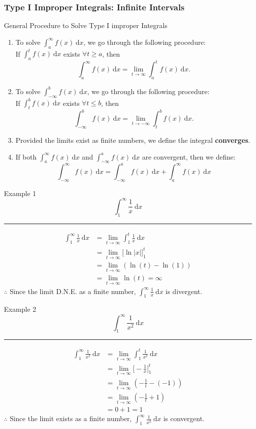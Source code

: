 \documentclass[12pt,a4paper]{article}
\def\d{{\mathrm{d}}}
\begin{document}
\subsubsection{Type I Improper Integrals: Infinite Intervals}
\begin{thm}{General Procedure to Solve Type I improper Integrals}
	\begin{enumerate}
		\item To solve $\displaystyle\int_a^\infty f(x)\ \d x$, we go through the following procedure: \\
		If $\displaystyle\int_a^tf(x)\ \d x$ exists $\forall t\geq a$, then $$\int_a^\infty f(x)\ \d x=\lim_{t\to\infty}\int_a^tf(x)\ \d x.$$
		\item To solve $\displaystyle\int^b_{-\infty} f(x)\ \d x$, we go through the following procedure: \\
		If $\displaystyle\int^b_tf(x)\ \d x$ exists $\forall t\leq b$, then $$\int^b_{-\infty} f(x)\ \d x=\lim_{t\to-\infty}\int^b_tf(x)\ \d x.$$
		\item Provided the limits exist as finite numbers, we define the integral \textbf{converges}.
		\item If both $\displaystyle\int_a^\infty f(x)\ \d x$ and $\displaystyle\int^a_{-\infty} f(x)\ \d x$ are convergent, then we define: 
		$$\int_{-\infty}^\infty f(x)\ \d x=\int^a_{-\infty} f(x)\ \d x+\int_a^\infty f(x)\ \d x$$
	\end{enumerate}
\end{thm}
\begin{eg}{Example 1}
	$$\int_1^\infty\frac{1}{x}\ \d x$$
	\noindent\rule[0.25\baselineskip]{\textwidth}{1pt}
	$$\begin{aligned}
		\int_1^\infty\frac{1}{x}\ \d x&=\lim_{t\to\infty}\int_1^t\frac{1}{x}\ \d x\\
		&=\lim_{t\to\infty}\bigg[\ln|x|\bigg]^t_1\\
		&=\lim_{t\to\infty}\left(\ln(t)-\ln(1)\right)\\
		&=\lim_{t\to\infty}\ln(t)=\infty
	\end{aligned}$$
	$\therefore$ Since the limit D.N.E. as a finite number, $\displaystyle\int_1^\infty\frac{1}{x}\ \d x$ is divergent. 
\end{eg}
\begin{eg}{Example 2}
	$$\int_1^\infty\frac{1}{x^2}\ \d x$$
	\noindent\rule[0.25\baselineskip]{\textwidth}{1pt}
	$$\begin{aligned}
		\int_1^\infty\frac{1}{x^2}\ \d x&=\lim_{t\to\infty}\int_1^t\frac{1}{x^2}\ \d x\\
		&=\lim_{t\to\infty}\bigg[-\frac{1}{x}\bigg]^t_1\\
		&=\lim_{t\to\infty}\left(-\frac{1}{t}-(-1)\right)\\
		&=\lim_{t\to\infty}\left(-\frac{1}{t}+1\right)\\
		&=0+1=1
	\end{aligned}$$
	$\therefore$ Since the limit exists as a finite number, $\displaystyle\int_1^\infty\frac{1}{x^2}\ \d x$ is convergent. 
\end{eg}
\end{document}

